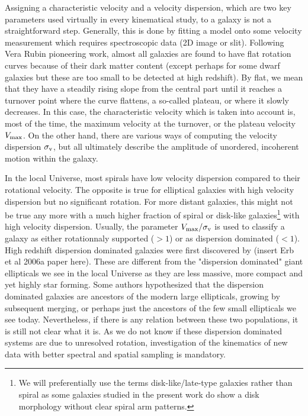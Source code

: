 Assigning a characteristic velocity and a velocity dispersion, which are two key parameters used virtually in every kinematical study, to a galaxy is not a straightforward step. Generally, this is done by fitting a model onto some velocity measurement which requires spectroscopic data (2D image or slit). Following Vera Rubin pioneering work, almost all galaxies are found to have flat rotation curves because of their dark matter content (except perhaps for some dwarf galaxies but these are too small to be detected at high redshift). By flat, we mean that they have a steadily rising slope from the central part until it reaches a turnover point where the curve flattens, a so-called plateau, or where it slowly decreases. In this case, the characteristic velocity which is taken into account is, most of the time, the maximum velocity at the turnover, or the plateau velocity $V_{\rm{max}}$. On the other hand, there are various ways of computing the velocity dispersion $\sigma_{\rm{v}}$, but all ultimately describe the amplitude of unordered, incoherent motion within the galaxy.

In the local Universe, most spirals have low velocity dispersion compared to their rotational velocity. The opposite is true for elliptical galaxies with high velocity dispersion but no significant rotation. For more distant galaxies, this might not be true any more with a much higher fraction of spiral or disk-like galaxies\footnote{We will preferentially use the terms disk-like/late-type galaxies rather than spiral as some galaxies studied in the present work do show a disk morphology without clear spiral arm patterns.} with high velocity dispersion. Usually, the parameter $V_{\rm{max}} / \sigma_{\rm{v}}$ is used to classify a galaxy as either rotationnaly supported ($> 1$) or as dispersion dominated ($< 1$). High redshift dispersion dominated galaxies were first discovered by (insert Erb et al 2006a paper here). These are different from the "dispersion dominated" giant ellipticals we see in the local Universe as they are less massive, more compact and yet highly star forming. Some authors hypothesized that the dispersion dominated galaxies are ancestors of the modern large ellipticals, growing by subsequent merging, or perhaps just the ancestors of the few small ellipticals we see today. Nevertheless, if there is any relation between these two populations, it is still not clear what it is. As we do not know if these dispersion dominated systems are due to unresolved rotation, investigation of the kinematics of new data with better spectral and spatial sampling is mandatory.

